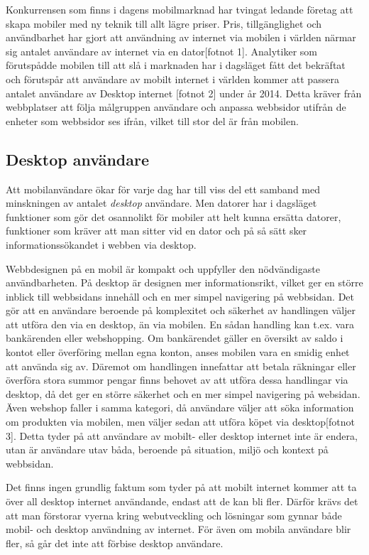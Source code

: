 \documentclass[11pt]{article}
\begin{document}
Konkurrensen som finns i dagens mobilmarknad har tvingat ledande företag att skapa mobiler med ny teknik till allt lägre priser. Pris, tillgänglighet och användbarhet har gjort att användning av internet via mobilen i världen närmar sig antalet användare av internet via en dator[fotnot 1]. Analytiker som förutspådde mobilen till att slå i marknaden har i dagsläget fått det bekräftat och förutspår att användare av mobilt internet i världen kommer att passera antalet användare av Desktop internet [fotnot 2] under år 2014. Detta kräver från webbplatser att följa målgruppen användare och anpassa webbsidor utifrån de enheter som webbsidor ses ifrån, vilket till stor del är från mobilen.

\subsection{Desktop användare}
Att mobilanvändare ökar för varje dag har till viss del ett samband med minskningen av antalet \textit{desktop} användare. Men datorer har i dagsläget funktioner som gör det osannolikt för mobiler att helt kunna ersätta datorer, funktioner som kräver att man sitter vid en dator och på så sätt sker informationssökandet i webben via desktop. 

Webbdesignen på en mobil är kompakt och uppfyller den nödvändigaste användbarheten.
På desktop är designen mer informationsrikt, vilket ger en större inblick till webbsidans innehåll och en mer simpel navigering på webbsidan. Det gör att en användare beroende på komplexitet och säkerhet av handlingen väljer att utföra den via en desktop, än via mobilen. En sådan handling kan t.ex. vara bankärenden eller webshopping. Om bankärendet gäller en översikt av saldo i kontot eller överföring mellan egna konton, anses mobilen vara en smidig enhet att använda sig av. Däremot om handlingen innefattar att betala räkningar eller överföra stora summor pengar finns behovet av att utföra dessa handlingar via desktop, då det ger en större säkerhet och en mer simpel navigering på websidan. Även webshop faller i samma kategori, då användare väljer att söka information om produkten via mobilen, men väljer sedan att utföra köpet via desktop[fotnot 3]. Detta tyder på att användare av mobilt- eller desktop internet inte är endera, utan är användare utav båda, beroende på situation, miljö och kontext på webbsidan.

Det finns ingen grundlig faktum som tyder på att mobilt internet kommer att ta över all desktop internet användande, endast att de kan bli fler. Därför krävs det att man förstorar vyerna kring webutveckling och lösningar som gynnar både mobil- och desktop användning av internet. För även om mobila användare blir fler, så går det inte att förbise desktop användare.
\end{document}
